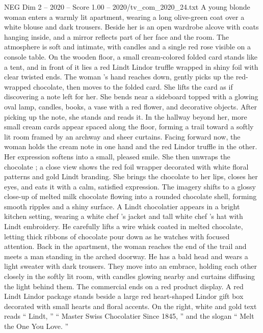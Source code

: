 \begin{textsample}{NEG Dim 2 – 2020 – Score 1.00 – 2020/tv\_com\_2020\_24.txt}  \label{ex:f2_neg_055}
A young blonde woman enters a warmly lit apartment, wearing a long olive-green coat over a white blouse and dark trousers.
Beside her is an open wardrobe alcove with coats hanging inside, and a mirror reflects part of her face and the room.
The atmosphere is soft and intimate, with candles and a single red rose visible on a console table.
On the wooden floor, a small cream-colored folded card stands like a tent, and in front of it lies a red Lindt Lindor truffle wrapped in shiny foil with clear twisted ends.
The woman ’s hand reaches down, gently picks up the red-wrapped chocolate, then moves to the folded card.
She lifts the card as if discovering a note left for her.
She bends near a sideboard topped with a glowing oval lamp, candles, books, a vase with a red flower, and decorative objects.
After picking up the note, she stands and reads it.
In the hallway beyond her, more small cream cards appear spaced along the floor, forming a trail toward a softly lit room framed by an archway and sheer curtains.
Facing forward now, the woman holds the cream note in one hand and the red Lindor truffle in the other.
Her expression softens into a small, pleased smile.
She then unwraps the chocolate ; a close view shows the red foil wrapper decorated with white floral patterns and gold Lindt branding.
She brings the chocolate to her lips, closes her eyes, and eats it with a calm, satisfied expression.
The imagery shifts to a glossy close-up of melted milk chocolate flowing into a rounded chocolate shell, forming smooth ripples and a shiny surface.
A Lindt chocolatier appears in a bright kitchen setting, wearing a white chef ’s jacket and tall white chef ’s hat with Lindt embroidery.
He carefully lifts a wire whisk coated in melted chocolate, letting thick ribbons of chocolate pour down as he watches with focused attention.
Back in the apartment, the woman reaches the end of the trail and meets a man standing in the arched doorway.
He has a bald head and wears a light sweater with dark trousers.
They move into an embrace, holding each other closely in the softly lit room, with candles glowing nearby and curtains diffusing the light behind them.
The commercial ends on a red product display.
A red Lindt Lindor package stands beside a large red heart-shaped Lindor gift box decorated with small hearts and floral accents.
On the right, white and gold text reads “ Lindt, ” “ Master Swiss Chocolatier Since 1845, ” and the slogan “ Melt the One You Love. ”

\end{textsample}
